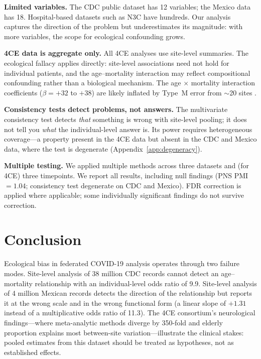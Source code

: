 \documentclass{article}
\begin{document}
\textbf{Limited variables.}  The CDC public dataset has 12 variables; the
Mexico data has 18.  Hospital-based datasets such as N3C have hundreds.
Our analysis captures the direction of the problem but underestimates its
magnitude: with more variables, the scope for ecological confounding grows.

\textbf{4CE data is aggregate only.}  All 4CE analyses use site-level
summaries.  The ecological fallacy applies directly: site-level associations
need not hold for individual patients, and the age--mortality interaction may
reflect compositional confounding rather than a biological mechanism.  The
age $\times$ mortality interaction coefficients ($\beta = +32$ to $+38$) are
likely inflated by Type~M error from $\sim$20 sites
\cite{gelman2014typeMS}.

\textbf{Consistency tests detect problems, not answers.}  The multivariate
consistency test detects \emph{that} something is wrong with site-level
pooling; it does not tell you \emph{what} the individual-level answer is.
Its power requires heterogeneous coverage---a property present in the 4CE
data but absent in the CDC and Mexico data, where the test is degenerate
(Appendix~\ref{app:degeneracy}).

\textbf{Multiple testing.}  We applied multiple methods across three
datasets and (for 4CE) three timepoints.  We report all results, including
null findings (PNS PMI $= 1.04$; consistency test degenerate on CDC and
Mexico).  FDR correction is applied where applicable; some individually
significant findings do not survive correction.


\section{Conclusion}

Ecological bias in federated COVID-19 analysis operates through two
failure modes.  Site-level analysis of 38 million CDC records cannot detect
an age--mortality relationship with an individual-level odds ratio of 9.9.  Site-level analysis of 4 million Mexican records detects the
direction of the relationship but reports it at the wrong scale and in the
wrong functional form (a linear slope of $+1.31$ instead of a multiplicative
odds ratio of 11.3).  The 4CE consortium's neurological findings---where
meta-analytic methods diverge by 350-fold and elderly proportion explains most
between-site variation---illustrate the clinical stakes: pooled estimates from
this dataset should be treated as hypotheses, not as established effects.
\end{document}
